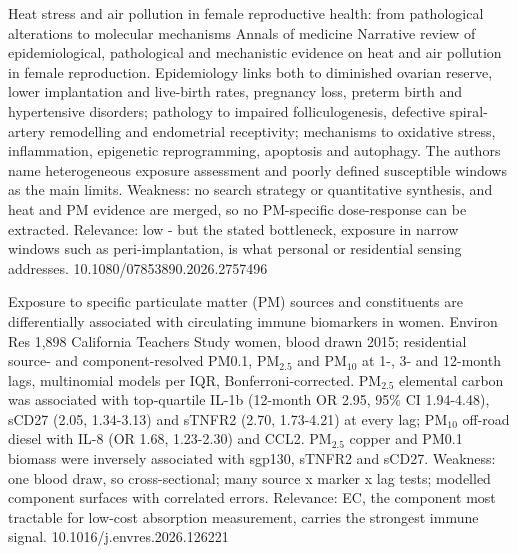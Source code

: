 \documentclass[10pt]{article}
\begin{document}
\par{}\baselineskip{}\baselineskip
{}

{Heat stress and air pollution in female reproductive health: from pathological alterations to molecular mechanisms}
{Annals of medicine}
{Narrative review of epidemiological, pathological and mechanistic evidence on heat and air pollution in female reproduction. Epidemiology links both to diminished ovarian reserve, lower implantation and live-birth rates, pregnancy loss, preterm birth and hypertensive disorders; pathology to impaired folliculogenesis, defective spiral-artery remodelling and endometrial receptivity; mechanisms to oxidative stress, inflammation, epigenetic reprogramming, apoptosis and autophagy. The authors name heterogeneous exposure assessment and poorly defined susceptible windows as the main limits. Weakness: no search strategy or quantitative synthesis, and heat and PM evidence are merged, so no PM-specific dose-response can be extracted. Relevance: low - but the stated bottleneck, exposure in narrow windows such as peri-implantation, is what personal or residential sensing addresses.}
{10.1080/07853890.2026.2757496}

\par{}\baselineskip{}\baselineskip
{}

{Exposure to specific particulate matter (PM) sources and constituents are differentially associated with circulating immune biomarkers in women.}
{Environ Res}
{1,898 California Teachers Study women, blood drawn 2015; residential source- and component-resolved PM0.1, PM$_{2.5}$ and PM$_{10}$ at 1-, 3- and 12-month lags, multinomial models per IQR, Bonferroni-corrected. PM$_{2.5}$ elemental carbon was associated with top-quartile IL-1b (12-month OR 2.95, 95\% CI 1.94-4.48), sCD27 (2.05, 1.34-3.13) and sTNFR2 (2.70, 1.73-4.21) at every lag; PM$_{10}$ off-road diesel with IL-8 (OR 1.68, 1.23-2.30) and CCL2. PM$_{2.5}$ copper and PM0.1 biomass were inversely associated with sgp130, sTNFR2 and sCD27. Weakness: one blood draw, so cross-sectional; many source x marker x lag tests; modelled component surfaces with correlated errors. Relevance: EC, the component most tractable for low-cost absorption measurement, carries the strongest immune signal.}
{10.1016/j.envres.2026.126221}
\end{document}
